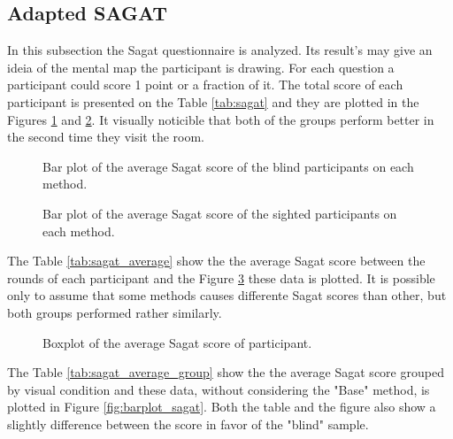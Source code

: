 \subsection{Adapted SAGAT}
\label{subsec:results_adapted_sagat}

In this subsection the Sagat questionnaire is analyzed. Its result's may give an ideia of the mental map the participant is drawing. For each question a participant could score 1 point or a fraction of it. The total score of each participant is presented on the Table \ref{tab:sagat} and they are plotted in the Figures \ref{fig:barplot_sagat_scene_blind} and \ref{fig:barplot_sagat_scene_sight}. It visually noticible that both of the groups perform better in the second time they visit the room.



\begin{figure}[!htb]
    \centering
    \resizebox{0.6\linewidth}{!}{
        
    }
    \caption{Bar plot of the average Sagat score of the blind participants on each method.}
    \label{fig:barplot_sagat_scene_blind}
\end{figure}

\begin{figure}[!htb]
    \centering
    \resizebox{0.6\linewidth}{!}{
        
    }
    \caption{Bar plot of the average Sagat score of the sighted participants on each method.}
    \label{fig:barplot_sagat_scene_sight}
\end{figure}

The Table \ref{tab:sagat_average} show the the average Sagat score between the rounds of each participant and the Figure \ref{fig:boxplot_sagat_scene} these data is plotted. It is possible only to assume that some methods causes differente Sagat scores than other, but both groups performed rather similarly.



\begin{figure}[!htb]
    \centering
    \resizebox{0.6\linewidth}{!}{
    
    }
    \caption{Boxplot of the average Sagat score of participant.}
    \label{fig:boxplot_sagat_scene}
\end{figure}

The Table \ref{tab:sagat_average_group} show the the average Sagat score grouped by visual condition and these data, without considering the "Base" method, is plotted in Figure \ref{fig:barplot_sagat}. Both the table and the figure also show a slightly difference between the score in favor of the "blind" sample.

